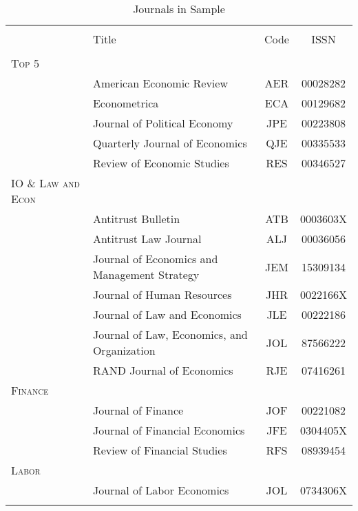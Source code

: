 \begin{table}[!h] \centering
    \caption{Journals in Sample}
    \label{}
\footnotesize
\begin{tabular}{@{\extracolsep{5pt}} llcc} 
\hline \\[-1.8ex] 
 & Title & Code & ISSN  \\ 
\hline \\[-1.8ex] 
\textsc{Top 5} & & \\
& American Economic Review & AER & 00028282\\
& Econometrica & ECA & 00129682\\
& Journal of Political Economy & JPE & 00223808\\
& Quarterly Journal of Economics & QJE & 00335533\\
& Review of Economic Studies & RES & 00346527\\
\textsc{IO \& Law and Econ} & & \\
& Antitrust Bulletin & ATB & 0003603X\\
& Antitrust Law Journal & ALJ & 00036056\\
& Journal of Economics and Management Strategy & JEM & 15309134\\
& Journal of Human Resources & JHR & 0022166X\\
& Journal of Law and Economics & JLE & 00222186\\
& Journal of Law, Economics, and Organization & JOL & 87566222\\
& RAND Journal of Economics & RJE & 07416261\\
\textsc{Finance} & & \\
& Journal of Finance & JOF & 00221082\\
& Journal of Financial Economics & JFE & 0304405X\\
& Review of Financial Studies & RFS & 08939454\\
\textsc{Labor} & & \\
& Journal of Labor Economics & JOL & 0734306X\\
\hline \\[-1.8ex]
\end{tabular}
\end{table}